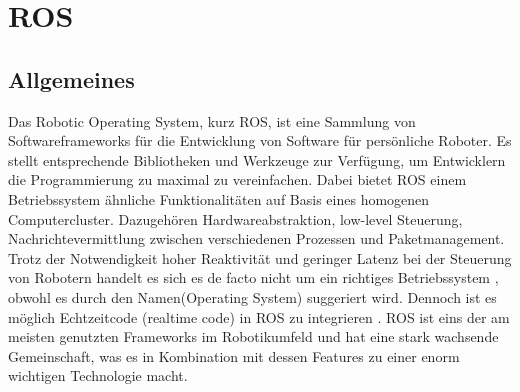 \section{ROS}
\label{ROS}
\subsection{Allgemeines}
Das Robotic Operating System, kurz ROS, ist eine Sammlung von Softwareframeworks für die Entwicklung von Software für persönliche Roboter. Es stellt entsprechende Bibliotheken und Werkzeuge zur Verfügung, um Entwicklern die Programmierung zu maximal zu vereinfachen. Dabei bietet ROS einem Betriebssystem ähnliche Funktionalitäten auf Basis eines homogenen Computercluster. Dazugehören Hardwareabstraktion, low-level Steuerung, Nachrichtevermittlung zwischen verschiedenen Prozessen und Paketmanagement. Trotz der Notwendigkeit hoher Reaktivität und geringer Latenz bei der Steuerung von Robotern handelt es sich es de facto nicht um ein richtiges Betriebssystem , obwohl es durch den Namen(\grqq Operating System\grqq) suggeriert wird. Dennoch ist es möglich Echtzeitcode (\grqq realtime code\grqq) in ROS zu integrieren \cite{realtimecode}. ROS ist eins der am meisten genutzten Frameworks im Robotikumfeld und hat eine stark wachsende Gemeinschaft, was es in Kombination mit dessen Features zu einer enorm wichtigen Technologie macht.\cite{rosbook} \cite{rosgeneral}


